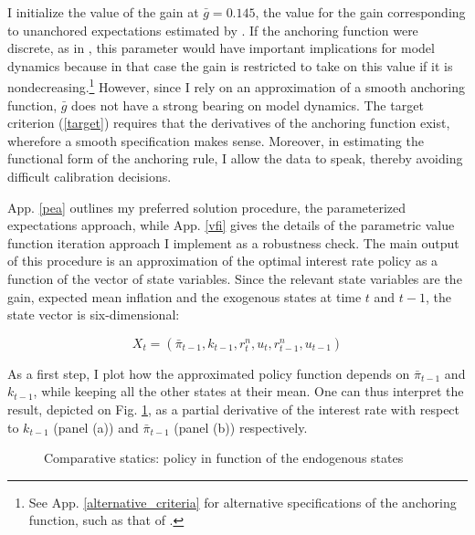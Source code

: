\documentclass[11pt]{article}
\def \myFigPath {../../figures/}
\renewcommand{\[}{\begin{equation}}
\renewcommand{\]}{\end{equation}}
\begin{document}
\vspace{-1.0cm}

I initialize the value of the gain at $\bar{g}=0.145$, the value for the gain corresponding to unanchored expectations estimated by \cite{carvalho2019anchored}. If the anchoring function were discrete, as in \cite{carvalho2019anchored}, this parameter would have important implications for model dynamics because in that case the gain is restricted to take on this value if it is nondecreasing.\footnote{See App. \ref{alternative_criteria} for alternative specifications of the anchoring function, such as that of \cite{carvalho2019anchored}.} However, since I rely on an approximation of a smooth anchoring function, $\bar{g}$ does not have a strong bearing on model dynamics. The target criterion (\ref{target}) requires that the derivatives of the anchoring function exist, wherefore a smooth specification makes sense. Moreover, in estimating the functional form of the anchoring rule, I allow the data to speak, thereby avoiding difficult calibration decisions.

App. \ref{pea} outlines my preferred solution procedure, the parameterized expectations approach, while App. \ref{vfi} gives the details of the parametric value function iteration approach I implement as a robustness check. The main output of this procedure is an approximation of the optimal interest rate policy as a function of the vector of state variables. Since the relevant state variables are the gain, expected mean inflation and the exogenous states at time $t$ and $t-1$, the state vector is six-dimensional:

\begin{equation}
X_t = (\bar{\pi}_{t-1}, k_{t-1}, r^n_t, u_t, r^n_{t-1}, u_{t-1})
\end{equation}

As a first step, I plot how the approximated policy function depends on $\bar{\pi}_{t-1}$ and $k_{t-1}$, while keeping all the other states at their mean. One can thus interpret the result, depicted on Fig. \ref{di}, as a partial derivative of the interest rate with respect to $k_{t-1}$ (panel (a)) and $\bar{\pi}_{t-1}$ (panel (b)) respectively.

\begin{figure}[h!]
\caption{Comparative statics: policy in function of the endogenous states}
\label{di}
\end{figure}
\end{document}
